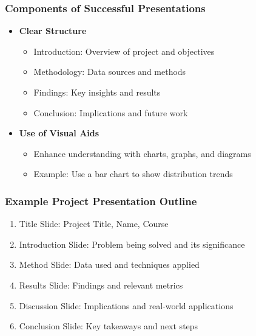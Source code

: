 \documentclass[aspectratio=169]{beamer}
\begin{document}
\begin{frame}[fragile]
  \frametitle{Components of Successful Presentations}
  \begin{itemize}
    \item \textbf{Clear Structure}
      \begin{itemize}
        \item Introduction: Overview of project and objectives
        \item Methodology: Data sources and methods
        \item Findings: Key insights and results
        \item Conclusion: Implications and future work
      \end{itemize}
    \item \textbf{Use of Visual Aids}
      \begin{itemize}
        \item Enhance understanding with charts, graphs, and diagrams
        \item Example: Use a bar chart to show distribution trends
      \end{itemize}
  \end{itemize}
\end{frame}

\begin{frame}[fragile]
  \frametitle{Example Project Presentation Outline}
  \begin{enumerate}
    \item Title Slide: Project Title, Name, Course
    \item Introduction Slide: Problem being solved and its significance
    \item Method Slide: Data used and techniques applied
    \item Results Slide: Findings and relevant metrics
    \item Discussion Slide: Implications and real-world applications
    \item Conclusion Slide: Key takeaways and next steps
  \end{enumerate}
\end{frame}
\end{document}
